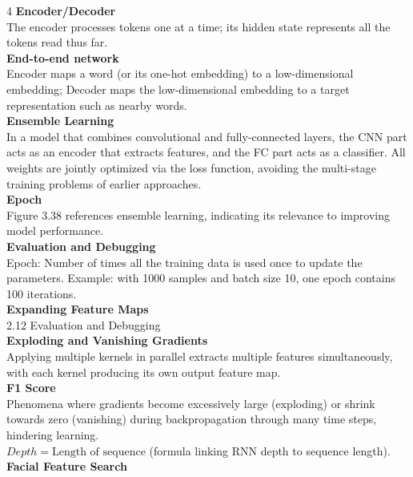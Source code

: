 \documentclass[8pt]{extarticle}
\begin{document}
\begin{multicols}{4}
\vspace{2pt}\textbf{Encoder/Decoder}\\
The encoder processes tokens one at a time; its hidden state represents all the tokens read thus far.\\
\vspace{2pt}\textbf{End-to-end network}\\
Encoder maps a word (or its one-hot embedding) to a low-dimensional embedding; Decoder maps the low-dimensional embedding to a target representation such as nearby words.\\
\vspace{2pt}\textbf{Ensemble Learning}\\
In a model that combines convolutional and fully-connected layers, the CNN part acts as an encoder that extracts features, and the FC part acts as a classifier. All weights are jointly optimized via the loss function, avoiding the multi-stage training problems of earlier approaches.\\
\vspace{2pt}\textbf{Epoch}\\
Figure 3.38 references ensemble learning, indicating its relevance to improving model performance.\\
\vspace{2pt}\textbf{Evaluation and Debugging}\\
Epoch: Number of times all the training data is used once to update the parameters. Example: with 1000 samples and batch size 10, one epoch contains 100 iterations.\\
\vspace{2pt}\textbf{Expanding Feature Maps}\\
2.12 Evaluation and Debugging\\
\vspace{2pt}\textbf{Exploding and Vanishing Gradients}\\
Applying multiple kernels in parallel extracts multiple features simultaneously, with each kernel producing its own output feature map.\\
\vspace{2pt}\textbf{F1 Score}\\
Phenomena where gradients become excessively large (exploding) or shrink towards zero (vanishing) during backpropagation through many time steps, hindering learning.\\
$Depth = \text{Length of sequence}$ (formula linking RNN depth to sequence length).\\
\vspace{2pt}\textbf{Facial Feature Search}\\

\end{multicols}
\end{document}
